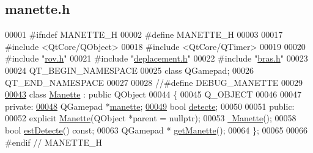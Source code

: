 \hypertarget{manette_8h_source}{}\subsection{manette.\+h}

\begin{DoxyCode}
00001 \textcolor{preprocessor}{#ifndef MANETTE\_H}
00002 \textcolor{preprocessor}{#define MANETTE\_H}
00003 
00017 \textcolor{preprocessor}{#include <QtCore/QObject>}
00018 \textcolor{preprocessor}{#include <QtCore/QTimer>}
00019 
00020 \textcolor{preprocessor}{#include "\hyperlink{rov_8h}{rov.h}"}
00021 \textcolor{preprocessor}{#include "\hyperlink{deplacement_8h}{deplacement.h}"}
00022 \textcolor{preprocessor}{#include "\hyperlink{bras_8h}{bras.h}"}
00023 
00024 QT\_BEGIN\_NAMESPACE
00025 \textcolor{keyword}{class }QGamepad;
00026 QT\_END\_NAMESPACE
00027 
00028 \textcolor{comment}{//#define DEBUG\_MANETTE}
00029 
\hyperlink{class_manette}{00043} \textcolor{keyword}{class }\hyperlink{class_manette}{Manette} : \textcolor{keyword}{public} QObject
00044 \{
00045     Q\_OBJECT
00046 
00047     \textcolor{keyword}{private}:
\hyperlink{class_manette_adc9690756093748bb851d4c1d3ba82ea}{00048}         QGamepad *\hyperlink{class_manette_adc9690756093748bb851d4c1d3ba82ea}{manette};  
\hyperlink{class_manette_a2b9c2c380a7bce40d2c6353d534ba6a9}{00049}         \textcolor{keywordtype}{bool} \hyperlink{class_manette_a2b9c2c380a7bce40d2c6353d534ba6a9}{detecte};       
00050 
00051     \textcolor{keyword}{public}:
00052         \textcolor{keyword}{explicit} \hyperlink{class_manette_a9a7b00a30cd6a7eea503c8bcfe5bbcbb}{Manette}(QObject *parent = \textcolor{keyword}{nullptr});
00053         \hyperlink{class_manette_a86a0cab49599b27d86c2e77f13fa54a2}{~Manette}();
00058         \textcolor{keywordtype}{bool} \hyperlink{class_manette_a035c0a43a11e91889891b3c874f0a58d}{estDetecte}() \textcolor{keyword}{const};
00063         QGamepad * \hyperlink{class_manette_a708eccb66e967e0fe575b19e9899ff5a}{getManette}();
00064 \};
00065 
00066 \textcolor{preprocessor}{#endif // MANETTE\_H}
\end{DoxyCode}
